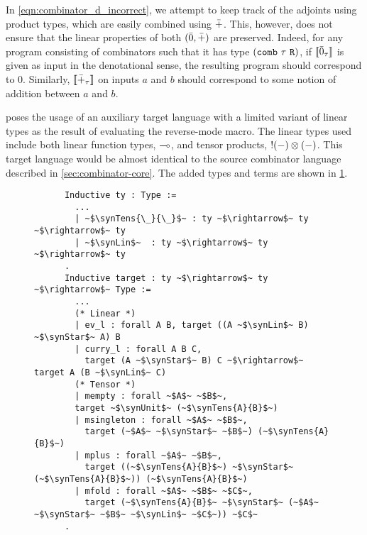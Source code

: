   In \cref{eqn:combinator_d_incorrect}, we attempt to keep track of the adjoints using product types, which are easily combined using $\bar{+}$.
  This, however, does not ensure that the linear properties of both $(\bar{0}, \bar{+})$ are preserved.
  Indeed, for any program consisting of combinators such that it has type $(\texttt{comb}\ \tau\ \texttt{R})$, if $\llbracket \bar{0}_\tau \rrbracket$ is given as input in the denotational sense, the resulting program should correspond to $0$.
  Similarly, $\llbracket \bar{+}_\tau \rrbracket$ on inputs $a$ and $b$ should correspond to some notion of addition between $a$ and $b$.

  \Vakar{} poses the usage of an auxiliary target language with a limited variant of linear types as the result of evaluating the reverse-mode macro\cite{vkr2020reverse}.
  The linear types used include both linear function types, $\multimap$, and tensor products, $!(-)\otimes(-)$.
  This target language would be almost identical to the source combinator language described in \cref{sec:combinator-core}.
  The added types and terms are shown in \cref{fig:combinator_linear}.

  \begin{figure}
    \centering
    \begin{verbatim}
      Inductive ty : Type :=
        ...
        | ~$\synTens{\_}{\_}$~ : ty ~$\rightarrow$~ ty ~$\rightarrow$~ ty
        | ~$\synLin$~  : ty ~$\rightarrow$~ ty ~$\rightarrow$~ ty
      .
      Inductive target : ty ~$\rightarrow$~ ty ~$\rightarrow$~ Type :=
        ...
        (* Linear *)
        | ev_l : forall A B, target ((A ~$\synLin$~ B) ~$\synStar$~ A) B
        | curry_l : forall A B C,
          target (A ~$\synStar$~ B) C ~$\rightarrow$~ target A (B ~$\synLin$~ C)
        (* Tensor *)
        | mempty : forall ~$A$~ ~$B$~,
        target ~$\synUnit$~ (~$\synTens{A}{B}$~)
        | msingleton : forall ~$A$~ ~$B$~,
          target (~$A$~ ~$\synStar$~ ~$B$~) (~$\synTens{A}{B}$~)
        | mplus : forall ~$A$~ ~$B$~,
          target ((~$\synTens{A}{B}$~) ~$\synStar$~ (~$\synTens{A}{B}$~)) (~$\synTens{A}{B}$~)
        | mfold : forall ~$A$~ ~$B$~ ~$C$~,
          target (~$\synTens{A}{B}$~ ~$\synStar$~ (~$A$~ ~$\synStar$~ ~$B$~ ~$\synLin$~ ~$C$~)) ~$C$~
      .
    \end{verbatim}
    \caption{}
    \label{fig:combinator_linear}
  \end{figure}


